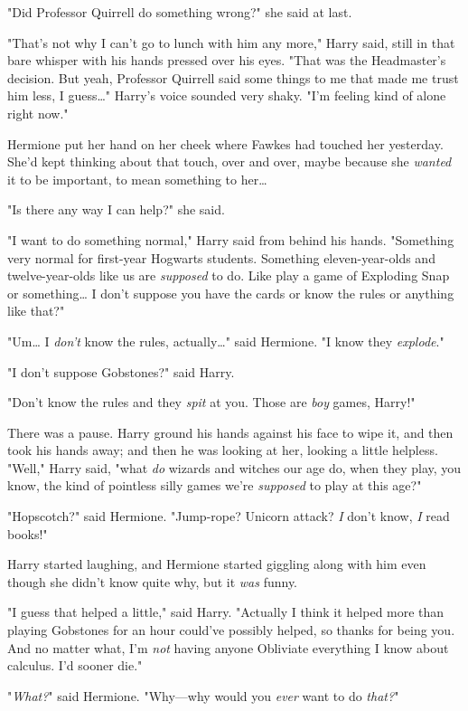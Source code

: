 "Did Professor Quirrell do something wrong?" she said at last.

"That's not why I can't go to lunch with him any more," Harry said, still in 
that bare whisper with his hands pressed over his eyes. "That was the 
Headmaster's decision. But yeah, Professor Quirrell said some things to me that 
made me trust him less, I guess{\ldots}" Harry's voice sounded very shaky. "I'm 
feeling kind of alone right now."

Hermione put her hand on her cheek where Fawkes had touched her yesterday. 
She'd kept thinking about that touch, over and over, maybe because she 
\emph{wanted} it to be important, to mean something to her{\ldots}

"Is there any way I can help?" she said.

"I want to do something normal," Harry said from behind his hands. "Something 
very normal for first-year Hogwarts students. Something eleven-year-olds and 
twelve-year-olds like us are \emph{supposed} to do. Like play a game of 
Exploding Snap or something{\ldots} I don't suppose you have the cards or know 
the rules or anything like that?"

"Um{\ldots} I \emph{don't} know the rules, actually{\ldots}" said Hermione. "I 
know they \emph{explode}."

"I don't suppose Gobstones?" said Harry.

"Don't know the rules and they \emph{spit} at you. Those are \emph{boy} games, 
Harry!"

There was a pause. Harry ground his hands against his face to wipe it, and then 
took his hands away; and then he was looking at her, looking a little helpless. 
"Well," Harry said, "what \emph{do} wizards and witches our age do, when they 
play, you know, the kind of pointless silly games we're \emph{supposed} to play 
at this age?"

"Hopscotch?" said Hermione. "Jump-rope? Unicorn attack? \emph{I} don't know, 
\emph{I} read books!"

Harry started laughing, and Hermione started giggling along with him even 
though she didn't know quite why, but it \emph{was} funny.

"I guess that helped a little," said Harry. "Actually I think it helped more 
than playing Gobstones for an hour could've possibly helped, so thanks for 
being you. And no matter what, I'm \emph{not} having anyone Obliviate 
everything I know about calculus. I'd sooner die."

"\emph{What?}" said Hermione. "Why---why would you \emph{ever} want to do 
\emph{that?}"

